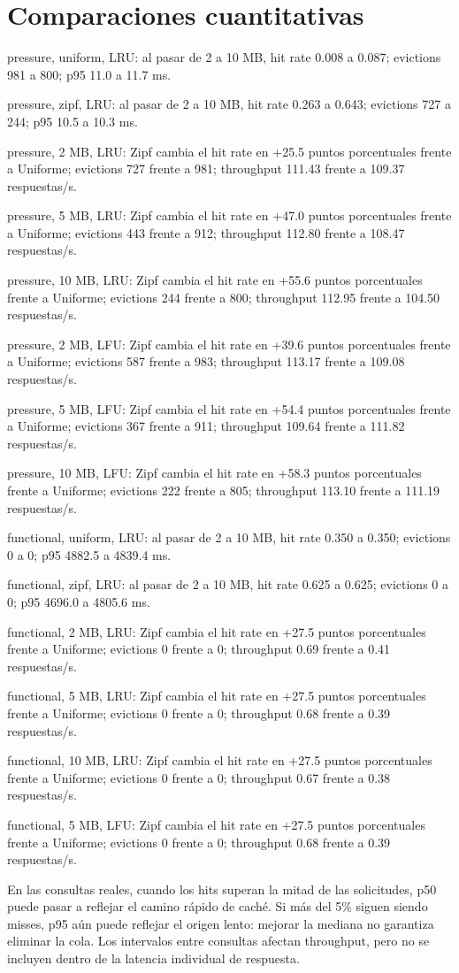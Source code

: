 \documentclass[11pt]{article}
\begin{document}
\section{Comparaciones cuantitativas}
pressure, uniform, LRU: al pasar de 2 a 10 MB, hit rate 0.008 a 0.087; evictions 981 a 800; p95 11.0 a 11.7 ms.\par
pressure, zipf, LRU: al pasar de 2 a 10 MB, hit rate 0.263 a 0.643; evictions 727 a 244; p95 10.5 a 10.3 ms.\par
pressure, 2 MB, LRU: Zipf cambia el hit rate en +25.5 puntos porcentuales frente a Uniforme; evictions 727 frente a 981; throughput 111.43 frente a 109.37 respuestas/s.\par
pressure, 5 MB, LRU: Zipf cambia el hit rate en +47.0 puntos porcentuales frente a Uniforme; evictions 443 frente a 912; throughput 112.80 frente a 108.47 respuestas/s.\par
pressure, 10 MB, LRU: Zipf cambia el hit rate en +55.6 puntos porcentuales frente a Uniforme; evictions 244 frente a 800; throughput 112.95 frente a 104.50 respuestas/s.\par
pressure, 2 MB, LFU: Zipf cambia el hit rate en +39.6 puntos porcentuales frente a Uniforme; evictions 587 frente a 983; throughput 113.17 frente a 109.08 respuestas/s.\par
pressure, 5 MB, LFU: Zipf cambia el hit rate en +54.4 puntos porcentuales frente a Uniforme; evictions 367 frente a 911; throughput 109.64 frente a 111.82 respuestas/s.\par
pressure, 10 MB, LFU: Zipf cambia el hit rate en +58.3 puntos porcentuales frente a Uniforme; evictions 222 frente a 805; throughput 113.10 frente a 111.19 respuestas/s.\par
functional, uniform, LRU: al pasar de 2 a 10 MB, hit rate 0.350 a 0.350; evictions 0 a 0; p95 4882.5 a 4839.4 ms.\par
functional, zipf, LRU: al pasar de 2 a 10 MB, hit rate 0.625 a 0.625; evictions 0 a 0; p95 4696.0 a 4805.6 ms.\par
functional, 2 MB, LRU: Zipf cambia el hit rate en +27.5 puntos porcentuales frente a Uniforme; evictions 0 frente a 0; throughput 0.69 frente a 0.41 respuestas/s.\par
functional, 5 MB, LRU: Zipf cambia el hit rate en +27.5 puntos porcentuales frente a Uniforme; evictions 0 frente a 0; throughput 0.68 frente a 0.39 respuestas/s.\par
functional, 10 MB, LRU: Zipf cambia el hit rate en +27.5 puntos porcentuales frente a Uniforme; evictions 0 frente a 0; throughput 0.67 frente a 0.38 respuestas/s.\par
functional, 5 MB, LFU: Zipf cambia el hit rate en +27.5 puntos porcentuales frente a Uniforme; evictions 0 frente a 0; throughput 0.68 frente a 0.39 respuestas/s.\par
En las consultas reales, cuando los hits superan la mitad de las solicitudes, p50 puede pasar a reflejar el camino rápido de caché. Si más del 5\% siguen siendo misses, p95 aún puede reflejar el origen lento: mejorar la mediana no garantiza eliminar la cola. Los intervalos entre consultas afectan throughput, pero no se incluyen dentro de la latencia individual de respuesta.\par
\end{document}
